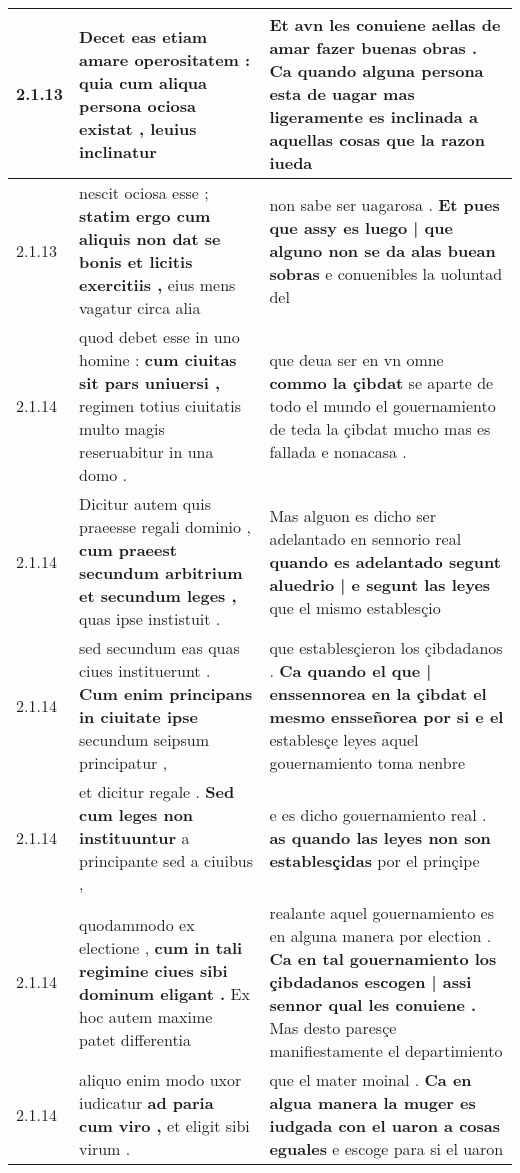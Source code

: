 \begin{tabular}{|p{1cm}|p{6.5cm}|p{6.5cm}|}
2.1.13 & Decet eas etiam amare operositatem : \textbf{ quia cum aliqua persona ociosa existat , } leuius inclinatur & Et avn les conuiene aellas de amar fazer buenas obras . \textbf{ Ca quando alguna persona esta de uagar mas ligeramente es inclinada a aquellas cosas } que la razon iueda \\\hline
2.1.13 & nescit ociosa esse ; \textbf{ statim ergo cum aliquis non dat se bonis et licitis exercitiis , } eius mens vagatur circa alia & non sabe ser uagarosa . \textbf{ Et pues que assy es luego | que alguno non se da alas buean sobras } e conuenibles la uoluntad del \\\hline
2.1.14 & quod debet esse in uno homine : \textbf{ cum ciuitas sit pars uniuersi , } regimen totius ciuitatis multo magis reseruabitur in una domo . & que deua ser en vn omne \textbf{ commo la çibdat } se aparte de todo el mundo el gouernamiento de teda la çibdat mucho mas es fallada e nonacasa . \\\hline
2.1.14 & Dicitur autem quis praeesse regali dominio , \textbf{ cum praeest secundum arbitrium et secundum leges , } quas ipse instistuit . & Mas alguon es dicho ser adelantado en sennorio real \textbf{ quando es adelantado segunt aluedrio | e segunt las leyes } que el mismo establesçio \\\hline
2.1.14 & sed secundum eas quas ciues instituerunt . \textbf{ Cum enim principans in ciuitate ipse } secundum seipsum principatur , & que establesçieron los çibdadanos . \textbf{ Ca quando el que | enssennorea en la çibdat el mesmo ensseñorea por si e el } establesçe leyes aquel gouernamiento toma nenbre \\\hline
2.1.14 & et dicitur regale . \textbf{ Sed cum leges non instituuntur } a principante sed a ciuibus , & e es dicho gouernamiento real . \textbf{ as quando las leyes non son establesçidas } por el prinçipe \\\hline
2.1.14 & quodammodo ex electione , \textbf{ cum in tali regimine ciues sibi dominum eligant . } Ex hoc autem maxime patet differentia & realante aquel gouernamiento es en alguna manera por election . \textbf{ Ca en tal gouernamiento los çibdadanos escogen | assi sennor qual les conuiene . } Mas desto paresçe manifiestamente el departimiento \\\hline
2.1.14 & aliquo enim modo uxor iudicatur \textbf{ ad paria cum viro , } et eligit sibi virum . & que el mater moinal . \textbf{ Ca en algua manera la muger es iudgada con el uaron a cosas eguales } e escoge para si el uaron \\\hline

\end{tabular}
